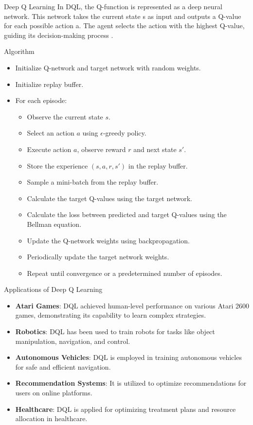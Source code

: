 \documentclass[presentation]{beamer}\mode<presentation>{\usetheme{AMSBolognaFC}}
\begin{document}
\begin{frame}{Deep Q Learning}
	In DQL, the Q-function is represented as a deep neural network. 
	This network takes the current state s as input and outputs a Q-value for 
	each possible action a. The agent selects the action with the highest Q-value, 
	guiding its decision-making process \cite{DBLP:journals/corr/MnihKSGAWR13}.
		\begin{block}{Algorithm}
			\begin{itemize}
				\item Initialize Q-network and target network with random weights.
				\item Initialize replay buffer.
				\item For each episode:
					\begin{itemize}
						\item Observe the current state $s$.
						\item Select an action $a$ using $\epsilon$-greedy policy.
						\item Execute action $a$, observe reward $r$ and next state $s'$.
						\item Store the experience $(s, a, r, s')$ in the replay buffer.
						\item Sample a mini-batch from the replay buffer.
						\item Calculate the target Q-values using the target network.
						\item Calculate the loss between predicted and target Q-values using the Bellman equation.
						\item Update the Q-network weights using backpropagation.
						\item Periodically update the target network weights.
						\item Repeat until convergence or a predetermined number of episodes.
					\end{itemize}
			\end{itemize}
		\end{block}
		\begin{block}{Applications of Deep Q Learning}
			\begin{itemize}
				\item \textbf{Atari Games}: DQL achieved human-level performance on various Atari 2600 games, demonstrating its capability to learn complex strategies.
				\item \textbf{Robotics}: DQL has been used to train robots for tasks like object manipulation, navigation, and control.
				\item \textbf{Autonomous Vehicles}: DQL is employed in training autonomous vehicles for safe and efficient navigation.
				\item \textbf{Recommendation Systems}: It is utilized to optimize recommendations for users on online platforms.
				\item \textbf{Healthcare}: DQL is applied for optimizing treatment plans and resource allocation in healthcare.
			\end{itemize}
		\end{block}
	\end{frame}
\end{document}
